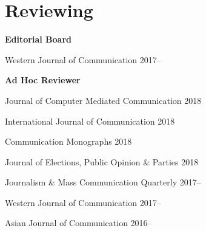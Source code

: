 \section{Reviewing}

  \textbf{Editorial Board}
    \begin{innerlist}
      \item Western Journal of Communication \hfill 2017--
    \end{innerlist}\vspace{1em}

  \textbf{Ad Hoc Reviewer}
    \begin{innerlist}
      \item Journal of Computer Mediated Communication \hfill 2018
      \item International Journal of Communication \hfill 2018
      \item Communication Monographs \hfill 2018
      \item Journal of Elections, Public Opinion \& Parties \hfill 2018
      \item Journalism \& Mass Communication Quarterly \hfill 2017--
      \item Western Journal of Communication \hfill 2017--
      \item Asian Journal of Communication \hfill 2016--
    \end{innerlist}\vspace{-.075in}
